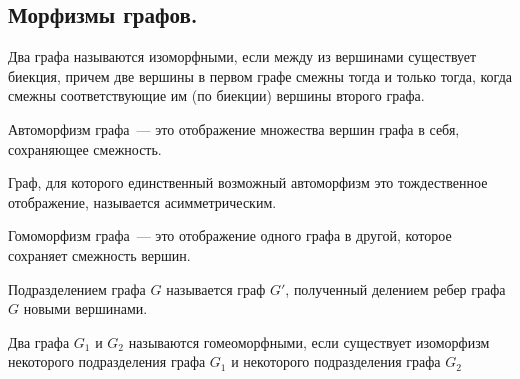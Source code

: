 \subsection{%
  Морфизмы графов.%
}

\begin{definition}
  Два графа называются изоморфными, если между из вершинами существует биекция,
  причем две вершины в первом графе смежны тогда и только тогда, когда смежны
  соответствующие им (по биекции) вершины второго графа.
\end{definition}

\begin{definition}
  Автоморфизм графа~--- это отображение множества вершин графа в себя,
  сохраняющее смежность.
\end{definition}

\begin{remark}
  Граф, для которого единственный возможный автоморфизм это тождественное
  отображение, называется асимметрическим.
\end{remark}

\begin{definition}
  Гомоморфизм графа~--- это отображение одного графа в другой, которое сохраняет
  смежность вершин.
\end{definition}

\begin{definition}
  Подразделением графа \(G\) называется граф \(G'\), полученный делением ребер
  графа \(G\) новыми вершинами.
\end{definition}

\begin{definition}
  Два графа \(G_{1}\) и \(G_{2}\) называются гомеоморфными, если существует
  изоморфизм некоторого подразделения графа \(G_{1}\) и некоторого подразделения
  графа \(G_{2}\)
\end{definition}
